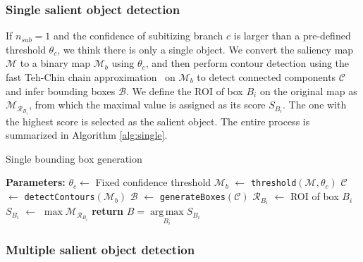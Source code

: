 \documentclass[10pt,twocolumn,letterpaper]{article}
\DeclareMathOperator*{\argmax}{arg\,max}
\begin{document}
\subsubsection{Single salient object detection}
\label{sec:single_detection}

If $n_{sub}=1$ and the confidence of subitizing branch $c$ is larger than a pre-defined threshold $\theta_c$, we think there is only a single object.
We %
convert the saliency map $\mathcal{M}$ to a binary map $\mathcal{M}_b$ using $\theta_c$, and then perform contour detection using the fast Teh-Chin chain approximation~\cite{teh1989detection} on $\mathcal{M}_b$ to detect connected components $\mathcal{C}$ and infer bounding boxes $\mathcal{B}$.
We define the ROI of box $B_i$ on the original map as $\mathcal{M}_{\mathcal{R}_{B_i}}$, from which the maximal value is assigned as its score $S_{B_i}$.
The one with the highest score is selected as the salient object.
The entire process is summarized in Algorithm \ref{alg:single}.
%
\begin{algorithm}[t]
\caption{Single bounding box generation}
\label{alg:single}
\begin{algorithmic}[1]
{\small
\Statex \textbf{Parameters:} $\theta_c \gets$ Fixed confidence threshold
\State $\mathcal{M}_b$ $\gets$ \texttt{threshold}$(\mathcal{M}, \theta_c)$
\State $\mathcal{C}$ $\gets$ \texttt{detectContours}$(\mathcal{M}_b)$
\State $\mathcal{B}$ $\gets$  \texttt{generateBoxes}$(\mathcal{C})$
	\State $\mathcal{R}_{B_i}$ $\gets$  ROI of box $B_i$
	\State $S_{B_i}$ $\gets$ $\max \mathcal{M}_{\mathcal{R}_{B_i}}$
\EndFor
\State \textbf{return} $B = \argmax\limits_{B_i} S_{B_i}$
\EndProcedure
}
\end{algorithmic}
\end{algorithm}


\subsubsection{Multiple salient object detection}
\label{sec:multi_detection}
\end{document}
